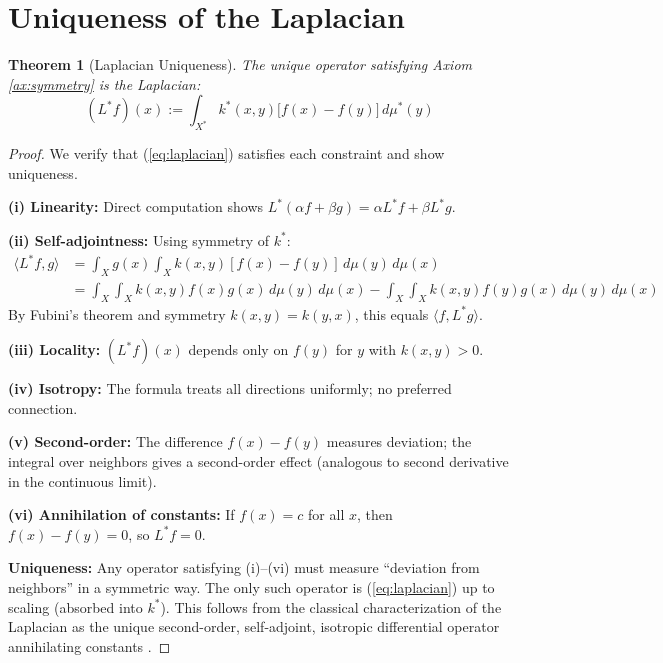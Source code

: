 \documentclass[11pt,a4paper]{article}
\theoremstyle{plain}
\newtheorem{theorem}{Theorem}[section]
\theoremstyle{definition}
\theoremstyle{remark}
\newcommand{\Laplacian}{L^*}
\newcommand{\ip}[2]{\langle #1, #2 \rangle}
\begin{document}
\section{Uniqueness of the Laplacian}

\begin{theorem}[Laplacian Uniqueness]\label{thm:uniqueness}
The unique operator satisfying Axiom \ref{ax:symmetry} is the Laplacian:
\begin{equation}\label{eq:laplacian}
(\Laplacian f)(x) := \int_{X^*} k^*(x,y) \big[ f(x) - f(y) \big] \, d\mu^*(y)
\end{equation}
\end{theorem}

\begin{proof}
We verify that (\ref{eq:laplacian}) satisfies each constraint and show uniqueness.

\textbf{(i) Linearity:} Direct computation shows $\Laplacian(\alpha f + \beta g) = \alpha \Laplacian f + \beta \Laplacian g$.

\textbf{(ii) Self-adjointness:} Using symmetry of $k^*$:
\begin{align*}
\ip{\Laplacian f}{g} &= \int_X g(x) \int_X k(x,y)[f(x) - f(y)] \, d\mu(y) \, d\mu(x) \\
&= \int_X \int_X k(x,y) f(x) g(x) \, d\mu(y) \, d\mu(x) - \int_X \int_X k(x,y) f(y) g(x) \, d\mu(y) \, d\mu(x)
\end{align*}
By Fubini's theorem and symmetry $k(x,y) = k(y,x)$, this equals $\ip{f}{\Laplacian g}$.

\textbf{(iii) Locality:} $(\Laplacian f)(x)$ depends only on $f(y)$ for $y$ with $k(x,y) > 0$.

\textbf{(iv) Isotropy:} The formula treats all directions uniformly; no preferred connection.

\textbf{(v) Second-order:} The difference $f(x) - f(y)$ measures deviation; the integral over neighbors gives a second-order effect (analogous to second derivative in the continuous limit).

\textbf{(vi) Annihilation of constants:} If $f(x) = c$ for all $x$, then $f(x) - f(y) = 0$, so $\Laplacian f = 0$.

\textbf{Uniqueness:} Any operator satisfying (i)--(vi) must measure ``deviation from neighbors'' in a symmetric way. The only such operator is (\ref{eq:laplacian}) up to scaling (absorbed into $k^*$). This follows from the classical characterization of the Laplacian as the unique second-order, self-adjoint, isotropic differential operator annihilating constants \cite{chung1997}.
\end{proof}
\end{document}
